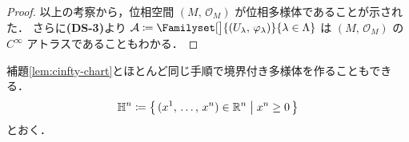\documentclass[geometry_main]{subfiles}
\begin{document}
\begin{proof}
    以上の考察から，位相空間 $(M,\, \mathscr{O}_M)$ が位相多様体であることが示された．
	さらに\textsf{\textbf{(DS-3)}}より $\mathcal{A} \coloneqq \Familyset[\big]{(U_\lambda,\, \varphi_\lambda)}{\lambda \in \Lambda}$ は $(M,\, \mathscr{O}_M)$ の $C^\infty$ アトラスであることもわかる．


	
\end{proof}

補題\ref{lem:cinfty-chart}とほとんど同じ手順で境界付き多様体を作ることもできる．
\begin{align}
    \mathbb{H}^n \coloneqq \bigl\{\, (x^1,\, \dots,\, x^n) \in \mathbb{R}^n \bigm| x^n \ge 0 \,\bigr\} 
\end{align}
とおく．
\end{document}
